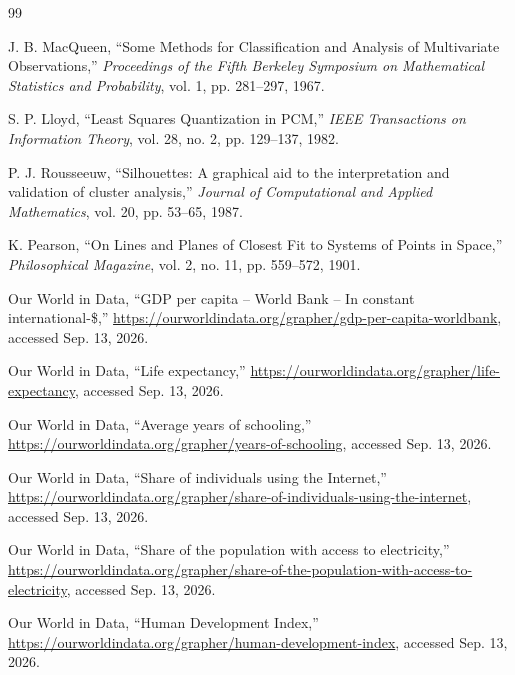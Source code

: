 \documentclass[11pt,a4paper]{article}
\begin{document}
\begin{thebibliography}{99}

J. B. MacQueen,
``Some Methods for Classification and Analysis of Multivariate Observations,''
\textit{Proceedings of the Fifth Berkeley Symposium on Mathematical Statistics and Probability},
vol. 1, pp. 281--297, 1967.

S. P. Lloyd,
``Least Squares Quantization in PCM,''
\textit{IEEE Transactions on Information Theory},
vol. 28, no. 2, pp. 129--137, 1982.

P. J. Rousseeuw,
``Silhouettes: A graphical aid to the interpretation and validation of cluster analysis,''
\textit{Journal of Computational and Applied Mathematics},
vol. 20, pp. 53--65, 1987.

K. Pearson,
``On Lines and Planes of Closest Fit to Systems of Points in Space,''
\textit{Philosophical Magazine},
vol. 2, no. 11, pp. 559--572, 1901.

Our World in Data,
``GDP per capita -- World Bank -- In constant international-\$,''
\url{https://ourworldindata.org/grapher/gdp-per-capita-worldbank},
accessed Sep. 13, 2026.

Our World in Data,
``Life expectancy,''
\url{https://ourworldindata.org/grapher/life-expectancy},
accessed Sep. 13, 2026.

Our World in Data,
``Average years of schooling,''
\url{https://ourworldindata.org/grapher/years-of-schooling},
accessed Sep. 13, 2026.

Our World in Data,
``Share of individuals using the Internet,''
\url{https://ourworldindata.org/grapher/share-of-individuals-using-the-internet},
accessed Sep. 13, 2026.

Our World in Data,
``Share of the population with access to electricity,''
\url{https://ourworldindata.org/grapher/share-of-the-population-with-access-to-electricity},
accessed Sep. 13, 2026.

Our World in Data,
``Human Development Index,''
\url{https://ourworldindata.org/grapher/human-development-index},
accessed Sep. 13, 2026.

\end{thebibliography}
\end{document}
